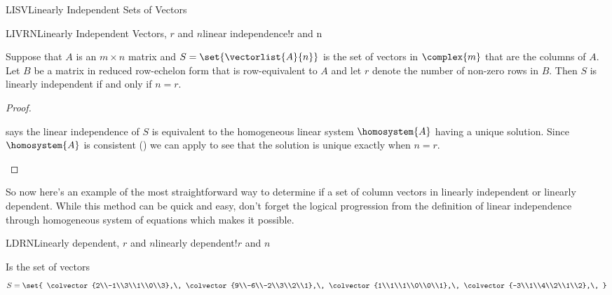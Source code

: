 \begin{subsect}{LISV}{Linearly Independent Sets of Vectors}
\begin{theorem}{LIVRN}{Linearly Independent Vectors, $r$ and $n$}{linear independence!r and n}
\begin{para}Suppose that $A$ is an $m\times n$ matrix and $S=\set{\vectorlist{A}{n}}$ is the set of vectors in $\complex{m}$ that are the columns of $A$.   Let $B$ be a matrix in reduced row-echelon form that is row-equivalent to $A$ and let $r$ denote the number of non-zero rows in $B$.  Then $S$ is linearly independent if and only if $n=r$.\end{para}
\end{theorem}
%
\begin{proof}
\begin{para} says the linear independence of $S$ is equivalent to the homogeneous linear system $\homosystem{A}$ having a unique solution.  Since $\homosystem{A}$ is consistent () we can apply  to see that the solution is unique exactly when $n=r$.
\end{para}
\end{proof}
%
\begin{para}So now here's an example of the most straightforward way to determine if a set of column vectors in linearly independent or linearly dependent.  While this method can be quick and easy, don't forget the logical progression from the definition of linear independence through homogeneous system of equations which makes it possible.\end{para}
%
\begin{example}{LDRN}{Linearly dependent, $r$ and $n$}{linearly dependent!$r$ and $n$}
\begin{para}Is the set of vectors
%
\begin{equation*}
S=\set{
\colvector{2\\-1\\3\\1\\0\\3},\,
\colvector{9\\-6\\-2\\3\\2\\1},\,
\colvector{1\\1\\1\\0\\0\\1},\,
\colvector{-3\\1\\4\\2\\1\\2},\,
}
\end{equation*}
\end{para}
\end{example}
\end{subsect}
